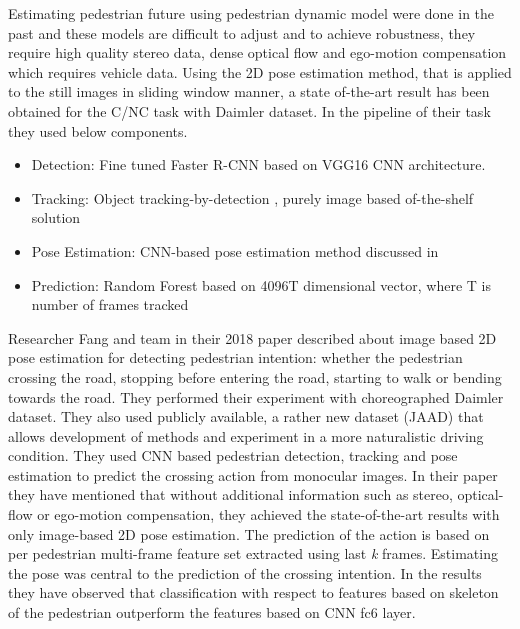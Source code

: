 Estimating pedestrian future using pedestrian dynamic model were done in the past and these models are difficult to adjust and to achieve robustness, they require high quality stereo data, dense optical flow and ego-motion compensation which requires vehicle data.  Using the 2D pose estimation method, that is applied to the still images in sliding window manner, a state of-the-art result has been obtained\cite{fang2018pedestrian} for the C/NC task with Daimler dataset. In the pipeline of their task they used below components.

\begin{itemize}
	\item Detection: Fine tuned Faster R-CNN \cite{ren2015faster} based on VGG16 CNN architecture. 
	\item Tracking: Object tracking-by-detection \cite{wojke2017simple}, purely image based of-the-shelf solution 
	\item Pose Estimation: CNN-based pose estimation method discussed in \cite{cao2017realtime}
	\item Prediction: Random Forest based on 4096T dimensional vector, where T is number of frames tracked
\end{itemize}


\newpara
Researcher Fang and team in their 2018 paper \cite{fang2018pedestrian} described about image based 2D pose estimation for detecting pedestrian intention: whether the pedestrian crossing the road, stopping before entering the road, starting to walk or bending towards the road. They performed their experiment with choreographed Daimler dataset. They also used publicly available, a rather new dataset (JAAD) \cite{kotseruba2016joint} that allows development of methods and experiment in a more naturalistic driving condition. They used CNN based pedestrian detection, tracking and pose estimation to predict the crossing action from monocular images. In their paper they have mentioned that without additional information such as stereo, optical-flow or ego-motion compensation, they achieved the state-of-the-art results with only image-based 2D pose estimation. The prediction of the action is based on per pedestrian multi-frame feature set extracted using last \textit{k} frames. Estimating the pose was central to the prediction of the crossing intention. In the results they have observed that classification with respect to features based on  skeleton of the pedestrian outperform the features based on CNN fc6 layer.


